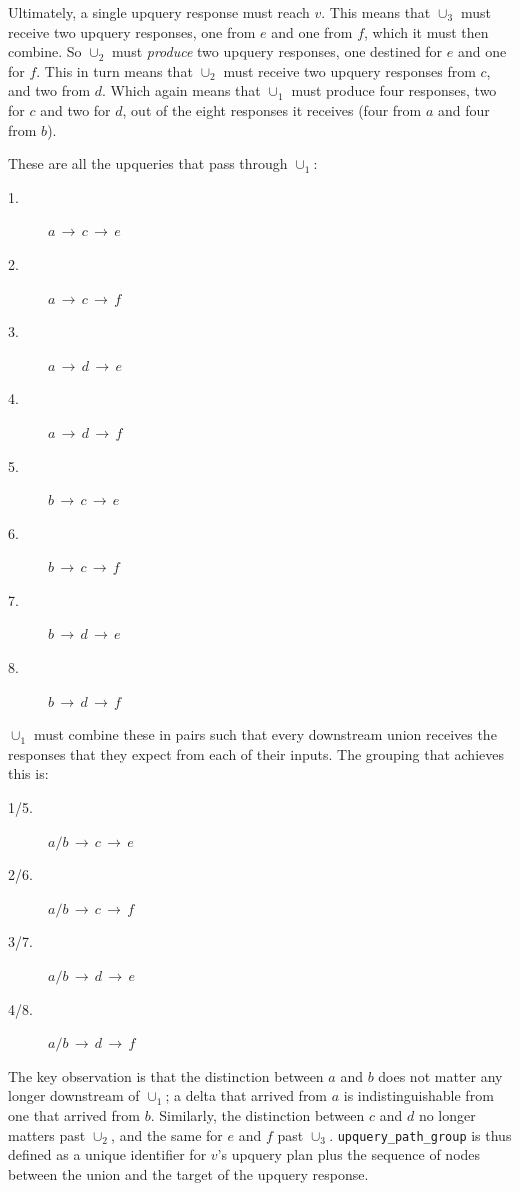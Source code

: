 Ultimately, a single upquery response must reach $v$. This means that $\cup_3$
must receive two upquery responses, one from $e$ and one from $f$, which it must
then combine. So $\cup_2$ must \emph{produce} two upquery responses, one
destined for $e$ and one for $f$. This in turn means that $\cup_2$ must receive
two upquery responses from $c$, and two from $d$. Which again means that
$\cup_1$ must produce four responses, two for $c$ and two for $d$, out of the
eight responses it receives (four from $a$ and four from $b$).

These are all the upqueries that pass through $\cup_1$:
        
\begin{multicols}{4}
\begin{description}
  \item [1.] $a\,\to\,c\,\to\,e$
  \item [2.] $a\,\to\,c\,\to\,f$
  \item [3.] $a\,\to\,d\,\to\,e$
  \item [4.] $a\,\to\,d\,\to\,f$
  \item [5.] $b\,\to\,c\,\to\,e$
  \item [6.] $b\,\to\,c\,\to\,f$
  \item [7.] $b\,\to\,d\,\to\,e$
  \item [8.] $b\,\to\,d\,\to\,f$
\end{description}
\end{multicols}

$\cup_1$ must combine these in pairs such that every downstream union receives
the responses that they expect from each of their inputs. The grouping that
achieves this is:

\begin{multicols}{2}
\begin{description}
  \item [1/5.] $a/b\,\to\,c\,\to\,e$
  \item [2/6.] $a/b\,\to\,c\,\to\,f$
  \item [3/7.] $a/b\,\to\,d\,\to\,e$
  \item [4/8.] $a/b\,\to\,d\,\to\,f$
\end{description}
\end{multicols}

The key observation is that the distinction between $a$ and $b$ does not matter
any longer downstream of $\cup_1$; a delta that arrived from $a$ is
indistinguishable from one that arrived from $b$. Similarly, the distinction
between $c$ and $d$ no longer matters past $\cup_2$, and the same for $e$ and
$f$ past $\cup_3$. \texttt{upquery\_path\_group} is thus defined as a unique
identifier for $v$'s upquery plan plus the sequence of nodes between the union
and the target of the upquery response.

